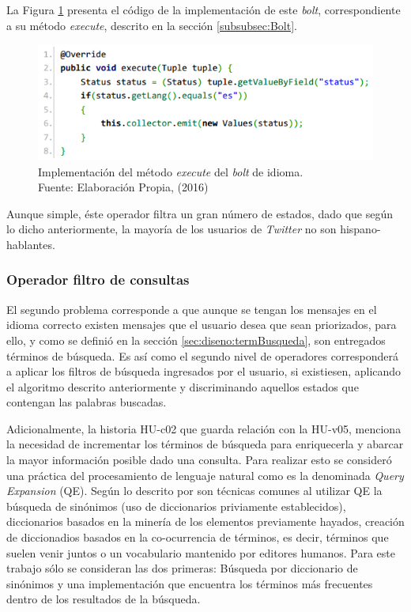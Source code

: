 La Figura \ref{fig:operadorIdioma} presenta el código de la implementación de este \textit{bolt}, correspondiente a su método \textit{execute}, descrito en la sección \ref{subsubsec:Bolt}.

\begin{figure}[H]
	\centering
	\captionsetup{justification=centering}
	\includegraphics[scale=0.8]{images/LanguageBoltExecute.png}
	\caption[Implementación del método \textit{execute} del \textit{bolt} de idioma.]{Implementación del método \textit{execute} del \textit{bolt} de idioma.\\Fuente: Elaboración Propia, (2016)}
	\label{fig:operadorIdioma}
\end{figure}

Aunque simple, éste operador filtra un gran número de estados, dado que según lo dicho anteriormente, la mayoría de los usuarios de \textit{Twitter} no son hispano-hablantes. 

\subsubsection*{Operador filtro de consultas}
\label{subsubsec:2op}

El segundo problema corresponde a que aunque se tengan los mensajes en el idioma correcto existen mensajes que el usuario desea que sean priorizados, para ello, y como se definió en la sección \ref{sec:diseno:termBusqueda}, son entregados términos de búsqueda. Es así como el segundo nivel de operadores corresponderá a aplicar los filtros de búsqueda ingresados por el usuario, si existiesen, aplicando el algoritmo descrito anteriormente y discriminando aquellos estados que contengan las palabras buscadas.

Adicionalmente, la historia HU-c02 que guarda relación con la HU-v05, menciona la necesidad de incrementar los términos de búsqueda para enriquecerla y abarcar la mayor información posible dado una consulta. Para realizar esto se consideró una práctica del procesamiento de lenguaje natural como es la denominada \textit{Query Expansion} (QE). Según lo descrito por \cite{IRQE} son técnicas comunes al utilizar QE la búsqueda de sinónimos (uso de diccionarios priviamente establecidos), diccionarios basados en la minería de los elementos previamente hayados, creación de diccionadios basados en la co-ocurrencia de términos, es decir, términos que suelen venir juntos o un vocabulario mantenido por editores humanos. Para este trabajo sólo se consideran las dos primeras: Búsqueda por diccionario de sinónimos y una implementación que encuentra los términos más frecuentes dentro de los resultados de la búsqueda.

